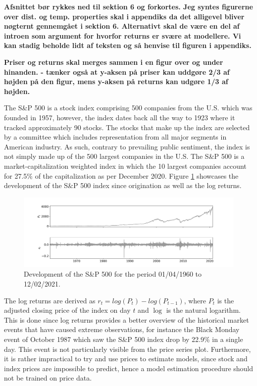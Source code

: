 \textbf{Afsnittet bør rykkes ned til sektion 6 og forkortes. Jeg syntes figurerne over dist. og temp. properties skal i appendiks da det alligevel bliver nøgternt gennemgået i sektion 6. Alternativt skal de være en del af introen som argument for hvorfor returns er svære at modellere. Vi kan stadig beholde lidt af teksten og så henvise til figuren i appendiks.}

\textbf{Priser og returns skal merges sammen i en figur over og under hinanden. - tænker også at y-aksen på priser kan uddgøre 2/3 af højden på den figur, mens y-aksen på returns kan udgøre 1/3 af højden.}

The S\&P 500 is a stock index comprising 500 companies from the U.S. which was founded in 1957, however, the index dates back all the way to 1923 where it tracked approximately 90 stocks. The stocks that make up the index are selected by a committee which includes representation from all major segments in American industry. As such, contrary to prevailing public sentiment, the index is not simply made up of the 500 largest companies in the U.S. The S\&P 500 is a market-capitalization weighted index in which the 10 largest companies account for 27.5\% of the capitalization as per December 2020. Figure \ref{fig: SP500_index} showcases the development of the S\&P 500 index since origination as well as the log returns. 
 
\begin{figure}[H] 
    \centering
    \includegraphics[width=1\textwidth]{analysis/data_description/images/SP500_index.png}
    \caption [Development of the S\&P 500] {Development of the S\&P 500 for the period 01/04/1960 to 12/02/2021.}
    \label{fig: SP500_index}
\end{figure}

The log returns are derived as $r_t = log(P_t) - log(P_{t-1})$, where $P_t$ is the adjusted closing price of the index on day $t$ and $\log$ is the natural logarithm. This is done since log returns provides a better overview of the historical market events that have caused extreme observations, for instance the Black Monday event of October 1987 which saw the S\&P 500 index drop by 22.9\% in a single day. This event is not particularly visible from the price series plot. Furthermore, it is rather impractical to try and use prices to estimate models, since stock and index prices are impossible to predict, hence a model estimation procedure should not be trained on price data.

